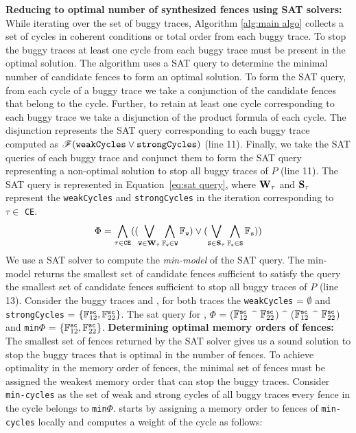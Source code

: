 \noindent
{\bf Reducing to optimal number of synthesized fences 
	using SAT solvers:}
While iterating over the set of buggy traces, Algorithm
\ref{alg:main algo} collects a set of cycles in coherent 
conditions or \sc total order from each buggy trace. 
To stop the buggy traces at least one cycle from each 
buggy trace must be present in the optimal solution.
%
The algorithm uses a SAT query to determine the minimal
number of candidate fences to form an optimal
solution. 
%
To form the SAT query, from each cycle of a buggy trace 
we take a conjunction of the candidate fences that belong 
to the cycle. Further, to retain at least one cycle 
corresponding to each buggy trace we take a disjunction
of the product formula of each cycle.
The disjunction represents the SAT query corresponding to 
each buggy trace computed as $\formula{{\tt weakCycles} \v 
{\tt strongCycles}}$ (line 11).
%
Finally, we take the SAT queries of each buggy trace and 
conjunct them to form the SAT query representing a 
non-optimal solution to stop all buggy traces of $P$ 
(line 11).
The SAT query is represented in Equation~\ref{eq:sat query},
where ${\tt \bf W_\tau}$ and ${\tt \bf S_\tau}$ represent
the {\tt weakCycles} and {\tt strongCycles} in the iteration
corresponding to $\tau \in$ {\tt CE}.
\begin{equation}\label{eq:sat query}
	\Phi = \bigwedge\limits_{\tau \in {\tt CE}}
		(
		(\bigvee\limits_{{\tt W} \in {\tt \bf W_\tau}}
			\bigwedge\limits_{\mathbb{F}_{\tt w} \in {\tt W}} 
			\mathbb{F}_{\tt w})
		\v
		(\bigvee\limits_{{\tt S} \in {\tt \bf S_\tau}}
			\bigwedge\limits_{\mathbb{F}_{\tt s} \in {\tt S}} 
			\mathbb{F}_{\tt s})
		)
\end{equation}
We use a SAT solver to compute the {\em min-model} of the 
SAT query. The min-model returns the smallest set of candidate 
fences sufficient to satisfy the query \ie the smallest set
of candidate fences sufficient to stop all buggy traces of 
$P$ (line 13).
%
Consider the buggy traces  and ,
for both traces the {\tt weakCycles} = $\emptyset$ and
{\tt strongCycles} = $\{\mathbb{F}^\sc_{12}, \mathbb{F}^\sc_{22}\}$.
The sat query for , $\Phi$ = 
($\mathbb{F}^\sc_{12}$ $\^$ $\mathbb{F}^\sc_{22}$) $\^$ 
($\mathbb{F}^\sc_{12}$ $\^$ $\mathbb{F}^\sc_{22}$) and 
{\tt min}$\Phi$ = $\{\mathbb{F}^\sc_{12}, \mathbb{F}^\sc_{22}\}$.
\noindent
{\bf Determining optimal memory orders of fences:}
The smallest set of fences returned by the SAT solver gives us 
a sound solution to stop the buggy traces that is optimal in the
number of fences.
To achieve optimality in the memory order of fences, the 
minimal set of fences must be assigned the weakest memory
order that can stop the buggy traces.
Consider {\tt min-cycles} as the set of weak and strong cycles 
of all buggy traces \st every  fence in the cycle belongs 
to {\tt min$\Phi$}. 
%
\ourtechnique starts by assigning a memory order to fences of 
{\tt min-cycles} locally and computes a weight of the cycle as 
follows: 


